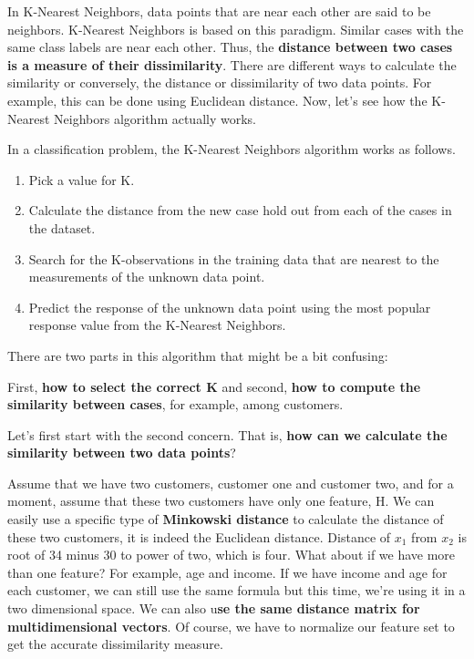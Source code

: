 	In K-Nearest Neighbors, data points that are near each other are said to be neighbors. K-Nearest Neighbors is based on this paradigm. Similar cases with the same class labels are near each other. Thus, the \textbf{distance between two cases is a measure of their dissimilarity}. There are different ways to calculate the similarity or conversely, the distance or dissimilarity of two data points. For example, this can be done using Euclidean distance. Now, let's see how the K-Nearest Neighbors algorithm actually works. 
	
	In a classification problem, the K-Nearest Neighbors algorithm works as follows. 
	
	\begin{enumerate}
		\item Pick a value for K.
		\item Calculate the distance from the new case hold out from each of the cases in the dataset. 
		\item Search for the K-observations in the training data that are nearest to the measurements of the unknown data point. 
		\item Predict the response of the unknown data point using the most popular response value from the K-Nearest Neighbors.
	\end{enumerate}
	

	There are two parts in this algorithm that might be a bit confusing:
	
	First, \textbf{how to select the correct K} and second, \textbf{how to compute the similarity between cases}, for example, among customers. 
	
	Let's first start with the second concern. That is, \textbf{how can we calculate the similarity between two data points}? 
	
	Assume that we have two customers, customer one and customer two, and for a moment, assume that these two customers have only one feature, H. We can easily use a specific type of \textbf{Minkowski distance} to calculate the distance of these two customers, it is indeed the Euclidean distance. Distance of $x_1$ from $x_2$ is root of 34 minus 30 to power of two, which is four. What about if we have more than one feature? For example, age and income. If we have income and age for each customer, we can still use the same formula but this time, we're using it in a two dimensional space. We can also u\textbf{se the same distance matrix for multidimensional vectors}. Of course, we have to normalize our feature set to get the accurate dissimilarity measure. 
	
